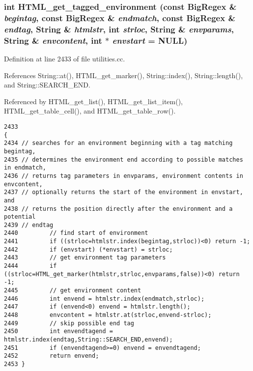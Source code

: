 \subsubsection{\setlength{\rightskip}{0pt plus 5cm}int HTML\_\-get\_\-tagged\_\-environment (const {\bf Big\-Regex} \& {\em begintag}, const {\bf Big\-Regex} \& {\em endmatch}, const {\bf Big\-Regex} \& {\em endtag}, {\bf String} \& {\em htmlstr}, int {\em strloc}, {\bf String} \& {\em envparams}, {\bf String} \& {\em envcontent}, int $\ast$ {\em envstart} = NULL)}\label{dil2al_8hh_a252}




Definition at line 2433 of file utilities.cc.

References String::at(), HTML\_\-get\_\-marker(), String::index(), String::length(), and String::SEARCH\_\-END.

Referenced by HTML\_\-get\_\-list(), HTML\_\-get\_\-list\_\-item(), HTML\_\-get\_\-table\_\-cell(), and HTML\_\-get\_\-table\_\-row().



\footnotesize\begin{verbatim}2433                                                                                                                                                                                                              {
2434 // searches for an environment beginning with a tag matching begintag,
2435 // determines the environment end according to possible matches in endmatch,
2436 // returns tag parameters in envparams, environment contents in envcontent,
2437 // optionally returns the start of the environment in envstart, and
2438 // returns the position directly after the environment and a potential
2439 // endtag
2440         // find start of environment
2441         if ((strloc=htmlstr.index(begintag,strloc))<0) return -1;
2442         if (envstart) (*envstart) = strloc;
2443         // get environment tag parameters
2444         if ((strloc=HTML_get_marker(htmlstr,strloc,envparams,false))<0) return -1;
2445         // get environment content
2446         int envend = htmlstr.index(endmatch,strloc);
2447         if (envend<0) envend = htmlstr.length();
2448         envcontent = htmlstr.at(strloc,envend-strloc);
2449         // skip possible end tag
2450         int envendtagend = htmlstr.index(endtag,String::SEARCH_END,envend);
2451         if (envendtagend>=0) envend = envendtagend;
2452         return envend;
2453 }
\end{verbatim}\normalsize 
{}
